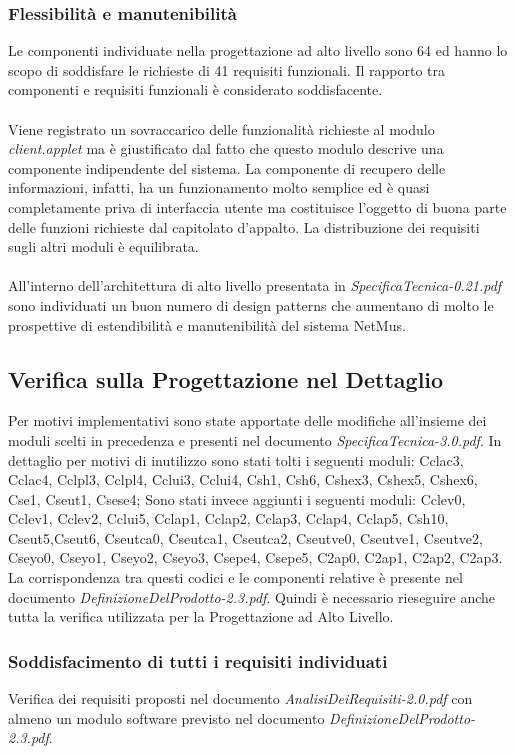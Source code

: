 \subsubsection*{Flessibilit\`a e manutenibilit\`a} 
Le componenti individuate nella
progettazione ad alto livello sono 64 ed hanno lo scopo di soddisfare le
richieste di 41 requisiti funzionali. Il rapporto tra componenti e requisiti
funzionali \`e considerato soddisfacente. \\\\ 
Viene registrato un sovraccarico delle funzionalit\`a richieste al modulo
\emph{client.applet} ma \`e giustificato dal fatto che questo modulo descrive
una componente indipendente del sistema. La componente di recupero delle
informazioni, infatti, ha un funzionamento molto semplice ed \`e quasi
completamente priva di interfaccia utente ma costituisce l'oggetto di buona
parte delle funzioni richieste dal capitolato d'appalto. La distribuzione dei
requisiti sugli altri moduli \`e equilibrata.\\\\
All'interno dell'architettura di alto livello presentata in
\emph{SpecificaTecnica-0.21.pdf} sono individuati un buon numero di design
patterns che aumentano di molto le prospettive di estendibilit\`a e
manutenibilit\`a del sistema NetMus.

\subsection{Verifica sulla Progettazione nel Dettaglio}
Per motivi implementativi sono state apportate delle modifiche all'insieme dei
moduli scelti in precedenza e presenti nel documento
\emph{SpecificaTecnica-3.0.pdf}. In dettaglio per motivi di inutilizzo sono
stati tolti i seguenti moduli: Cclac3, Cclac4, Cclpl3, Cclpl4, Cclui3, Cclui4,
Csh1, Csh6, Cshex3, Cshex5, Cshex6, Cse1, Cseut1, Csese4; Sono stati invece
aggiunti i seguenti moduli: Cclev0, Cclev1, Cclev2, Cclui5, Cclap1, Cclap2,
Cclap3, Cclap4, Cclap5, Csh10, Cseut5,Cseut6, Cseutca0, Cseutca1, Cseutca2,
Cseutve0, Cseutve1, Cseutve2, Cseyo0, Cseyo1, Cseyo2, Cseyo3, Csepe4, Csepe5,
C2ap0, C2ap1, C2ap2, C2ap3. La corrispondenza tra questi codici e le componenti
relative \`e presente nel documento \emph{DefinizioneDelProdotto-2.3.pdf}.
Quindi \`e necessario rieseguire anche tutta la verifica utilizzata per la
Progettazione ad Alto Livello.

\subsubsection*{Soddisfacimento di tutti i requisiti individuati} Verifica dei
requisiti proposti nel documento \emph{AnalisiDeiRequisiti-2.0.pdf} con almeno
un modulo software previsto nel documento \emph{DefinizioneDelProdotto-2.3.pdf}.

